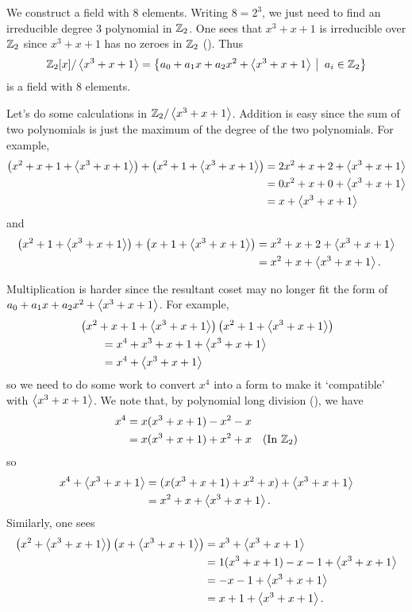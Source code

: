 \begin{example}
    We construct a field with 8 elements. Writing $8 = 2^3$, we just need to find an irreducible degree 3 polynomial in $\mathbb{Z}_2$. One sees that $x^3 + x + 1$ is irreducible over $\mathbb{Z}_2$ since $x^3 + x + 1$ has no zeroes in $\mathbb{Z}_2$ (). Thus
    \[
        \Z_2[x]/\princ{x^3+x+1} = \left\{a_0 + a_1x + a_2x^2 + \princ{x^3+x+1} \vert a_i \in \Z_2\right\}
    \]
    is a field with 8 elements.

    Let's do some calculations in $\mathbb{Z}_2/\left\langle x^3+x+1\right\rangle$. Addition is easy since the sum of two polynomials is just the maximum of the degree of the two polynomials. For example,
    \begin{align*}
        \left(x^2 + x + 1 + \left\langle x^3 + x + 1\right\rangle\right) + \left(x^2 + 1 + \left\langle x^3 + x + 1\right\rangle\right) &= 2x^2 + x + 2 + \left\langle x^3 + x + 1\right\rangle\\
        &= 0x^2 + x + 0 + \left\langle x^3 + x + 1\right\rangle\\
        &= x + \left\langle x^3 + x + 1\right\rangle
    \end{align*}
    and
    \begin{align*}
        \left(x^2 + 1 + \left\langle x^3 + x + 1\right\rangle\right) + \left(x + 1 + \left\langle x^3 + x + 1\right\rangle\right) &= x^2 + x + 2 + \left\langle x^3 + x + 1\right\rangle\\
        &= x^2 + x + \left\langle x^3 + x + 1\right\rangle.
    \end{align*}

    Multiplication is harder since the resultant coset may no longer fit the form of $a_0 + a_1x + a_2x^2 + \left\langle x^3+x+1\right\rangle$. For example,
    \begin{align*}
        &\left(x^2 + x + 1 + \left\langle x^3 + x + 1\right\rangle\right)\left(x^2 + 1 + \left\langle x^3 + x + 1\right\rangle\right)\\
        &\quad\quad= x^4+x^3+x+1 + \left\langle x^3 + x + 1\right\rangle\\
        &\quad\quad= x^4 + \left\langle x^3 + x + 1\right\rangle
    \end{align*}
    so we need to do some work to convert $x^4$ into a form to make it `compatible' with $\left\langle x^3 + x + 1\right\rangle$. We note that, by polynomial long division (), we have
    \begin{align*}
        x^4 &= x(x^3+x+1) - x^2 - x\\
        &= x(x^3+x+1) + x^2 + x & (\text{In } \mathbb{Z}_2)
    \end{align*}
    so
    \begin{align*}
        x^4 + \left\langle x^3 + x + 1\right\rangle &= (x(x^3+x+1) + x^2 + x) + \left\langle x^3 + x + 1\right\rangle\\
        &= x^2 + x + \left\langle x^3 + x + 1\right\rangle.
    \end{align*}
    Similarly, one sees
    \begin{align*}
        \left(x^2 + \left\langle x^3 + x + 1\right\rangle\right)\left(x + \left\langle x^3 + x + 1\right\rangle\right) &= x^3 + \left\langle x^3 + x + 1\right\rangle\\
        &= 1(x^3+x+1) - x - 1 + \left\langle x^3 + x + 1\right\rangle\\
        &= -x - 1 + \left\langle x^3 + x + 1\right\rangle\\
        &= x + 1 + \left\langle x^3 + x + 1\right\rangle.
    \end{align*}
\end{example}
